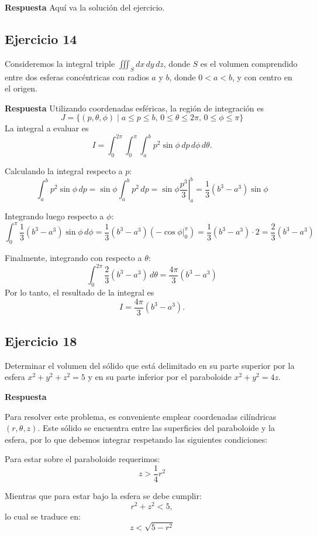 \documentclass{report}
\begin{document}
\textbf{Respuesta}
Aquí va la solución del ejercicio.\subsection{Ejercicio 14}
Consideremos la integral triple \(\iiint_{S} dx \, dy \, dz\), donde \(S\) es el volumen comprendido entre dos esferas concéntricas con radios \(a\) y \(b\), donde \(0<a<b\), y con centro en el origen.

\textbf{Respuesta} Utilizando coordenadas esféricas, la región de integración es
\[
J = \{(p, \theta, \phi) \mid a \leq p \leq b, \, 0 \leq \theta \leq 2\pi, \, 0 \leq \phi \leq \pi\}
\]
La integral a evaluar es
\[
I = \int_{0}^{2\pi} \int_{0}^{\pi} \int_{a}^{b} p^{2} \sin \phi \, dp \, d\phi \, d\theta.
\]

Calculando la integral respecto a \(p\):
\[
\int_{a}^{b} p^{2} \sin \phi \, dp = \sin \phi \int_{a}^{b} p^{2} \, dp = \left. \sin \phi \frac{p^{3}}{3} \right|_{a}^{b} = \frac{1}{3} \left( b^{3} - a^{3} \right) \sin \phi \tag{1}
\]

Integrando luego respecto a \(\phi\):
\[
\int_{0}^{\pi} \frac{1}{3} \left( b^{3} - a^{3} \right) \sin \phi \, d\phi = \frac{1}{3} \left( b^{3} - a^{3} \right) \left( -\left. \cos \phi \right|_{0}^{\pi} \right) = \frac{1}{3} \left( b^{3} - a^{3} \right) \cdot 2 = \frac{2}{3} \left( b^{3} - a^{3} \right) \tag{2}
\]

Finalmente, integrando con respecto a \(\theta\):
\[
\int_{0}^{2\pi} \frac{2}{3} \left( b^{3} - a^{3} \right) \, d\theta = \frac{4\pi}{3} \left( b^{3} - a^{3} \right)
\]
Por lo tanto, el resultado de la integral es
\[
I = \frac{4\pi}{3} \left( b^{3} - a^{3} \right).
\]\subsection{Ejercicio 18}
Determinar el volumen del sólido que está delimitado en su parte superior por la esfera $x^{2}+y^{2}+z^{2}=5$ y en su parte inferior por el paraboloide $x^{2}+y^{2}=4z$.

\textbf{Respuesta}

Para resolver este problema, es conveniente emplear coordenadas cilíndricas \((r, \theta, z)\). Este sólido se encuentra entre las superficies del paraboloide y la esfera, por lo que debemos integrar respetando las siguientes condiciones:

Para estar sobre el paraboloide requerimos:
\[
z > \frac{1}{4} r^2 \tag{1}
\]

Mientras que para estar bajo la esfera se debe cumplir:
\[
r^2 + z^2 < 5,
\]
lo cual se traduce en:
\[
z < \sqrt{5 - r^2} \tag{2}
\]
\end{document}
